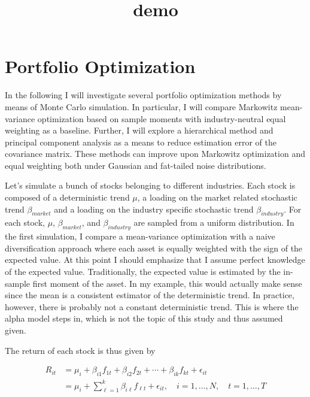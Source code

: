 \documentclass[11pt]{article}
\title{demo}
\begin{document}
    
    
    \maketitle
    
    

    
    \hypertarget{portfolio-optimization}{%
\section{Portfolio Optimization}\label{portfolio-optimization}}

    In the following I will investigate several portfolio optimization
methods by means of Monte Carlo simulation. In particular, I will
compare Markowitz mean-variance optimization based on sample moments
with industry-neutral equal weighting as a baseline. Further, I will
explore a hierarchical method and principal component analysis as a
means to reduce estimation error of the covariance matrix. These methods
can improve upon Markowitz optimization and equal weighting both under
Gaussian and fat-tailed noise distributions.

Let's simulate a bunch of stocks belonging to different industries. Each
stock is composed of a deterministic trend \(\mu\), a loading on the
market related stochastic trend \(\beta_{market}\) and a loading on the
industry specific stochastic trend \(\beta_{industry}\). For each stock,
\(\mu\), \(\beta_{market}\), and \(\beta_{industry}\) are sampled from a
uniform distribution. In the first simulation, I compare a mean-variance
optimization with a naive diversification approach where each asset is
equally weighted with the sign of the expected value. At this point I
should emphasize that I assume perfect knowledge of the expected value.
Traditionally, the expected value is estimated by the in-sample first
moment of the asset. In my example, this would actually make sense since
the mean is a consistent estimator of the deterministic trend. In
practice, however, there is probably not a constant deterministic trend.
This is where the alpha model steps in, which is not the topic of this
study and thus assumed given.

The return of each stock is thus given by

\[\begin{aligned} R_{i t} &=\mu_{i}+\beta_{i 1} f_{1 t}+\beta_{i 2} f_{2 t}+\cdots+\beta_{i k} f_{k t}+\epsilon_{i t} \\ &=\mu_{i}+\sum_{\ell=1}^{k} \beta_{i \ell} f_{\ell t}+\epsilon_{i t}, \quad i=1, \ldots, N, \quad t=1, \ldots, T \end{aligned}\]
\end{document}
